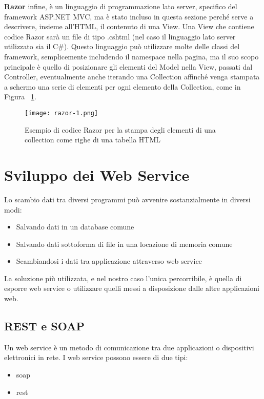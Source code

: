 \textbf{Razor} \cite{razor} infine, è un linguaggio di programmazione lato server, specifico del framework ASP.NET MVC, ma è stato incluso in questa sezione perché serve a descrivere, insieme all'HTML, il contenuto di una View.
Una View che contiene codice Razor sarà un file di tipo .cshtml (nel caso il linguaggio lato server utilizzato sia il C\#).
Questo linguaggio può utilizzare molte delle classi del framework, semplicemente includendo il namespace nella pagina, ma il suo scopo principale è quello di posizionare gli elementi del Model nella View, passati dal Controller, eventualmente anche iterando una Collection affinché venga stampata a schermo una serie di elementi per ogni elemento della Collection, come in Figura ~\ref{fig:Razor}.

\begin{figure}[H]
    \centering
    \texttt{[image: razor-1.png]}
    \caption{Esempio di codice Razor per la stampa degli elementi di una collection come righe di una tabella HTML}
    \label{fig:Razor}
\end{figure}


\section{Sviluppo dei Web Service}

Lo scambio dati tra diversi programmi può avvenire sostanzialmente in diversi modi:
\begin{itemize}
    \item Salvando dati in un database comune
    \item Salvando dati sottoforma di file in una locazione di memoria comune
    \item Scambiandosi i dati tra applicazione attraverso web service
\end{itemize}
La soluzione più utilizzata, e nel nostro caso l'unica percorribile, è quella di esporre web service o utilizzare quelli messi a disposizione dalle altre applicazioni web.


\subsection{REST e SOAP}

Un web service è un metodo di comunicazione tra due applicazioni o dispositivi elettronici in rete.
I web service possono essere di due tipi:
\begin{itemize}
    \item \Gls{soap}
    \item \Gls{rest}
\end{itemize}

